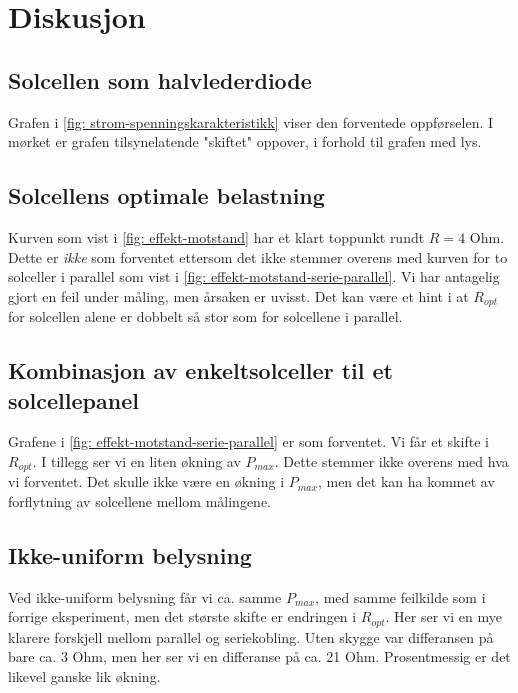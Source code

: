 \documentclass[reprint,norsk,notitlepage]{revtex4-2}
\begin{document}
\section{Diskusjon} \label{sec: discussion}
\subsection{Solcellen som halvlederdiode}
Grafen i \cref{fig: strom-spenningskarakteristikk} viser den forventede oppførselen. I mørket er grafen tilsynelatende "skiftet" oppover, i forhold til grafen med lys.

\subsection{Solcellens optimale belastning}
Kurven som vist i \cref{fig: effekt-motstand} har et klart toppunkt rundt $R = 4$ Ohm. Dette er \textit{ikke} som forventet ettersom det ikke stemmer overens med kurven for to solceller i parallel som vist i \cref{fig: effekt-motstand-serie-parallel}. Vi har antagelig gjort en feil under måling, men årsaken er uvisst. Det kan være et hint i at $R_{opt}$ for solcellen alene er dobbelt så stor som for solcellene i parallel.  

\subsection{Kombinasjon av enkeltsolceller til et solcellepanel}
Grafene i \cref{fig: effekt-motstand-serie-parallel} er som forventet. Vi får et skifte i $R_{opt}$. I tillegg ser vi en liten økning av $P_{max}$. Dette stemmer ikke overens med hva vi forventet. Det skulle ikke være en økning i $P_{max}$, men det kan ha kommet av forflytning av solcellene mellom målingene. 

\subsection{Ikke-uniform belysning}
Ved ikke-uniform belysning får vi ca. samme $P_{max}$, med samme feilkilde som i forrige eksperiment, men det største skifte er endringen i $R_{opt}$. Her ser vi en mye klarere forskjell mellom parallel og seriekobling. Uten skygge var differansen på bare ca. 3 Ohm, men her ser vi en differanse på ca. 21 Ohm. Prosentmessig er det likevel ganske lik økning.  
\end{document}
